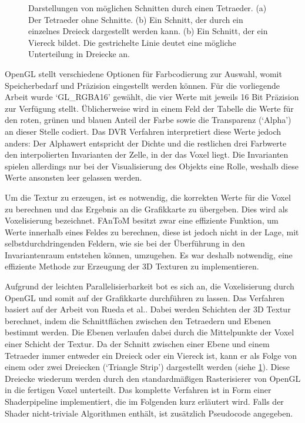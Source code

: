 \documentclass[a4paper,fontsize=12pt,toc=bib,halfparskip,ngerman]{scrartcl}
\begin{document}
\begin{figure}
\begin{subfigure}{0.2\textwidth}
		\caption{}
	\end{subfigure}
	\hspace{0.5cm}
	\caption{Darstellungen von m\"oglichen Schnitten durch einen Tetraeder. (a) Der Tetraeder ohne Schnitte. (b) Ein Schnitt, der durch ein einzelnes Dreieck dargestellt werden kann. (b) Ein Schnitt, der ein Viereck bildet. Die gestrichelte Linie deutet eine m\"ogliche Unterteilung in Dreiecke an.}
	\label{TetraCuts}
\end{figure}

OpenGL stellt verschiedene Optionen f\"ur Farbcodierung zur Auswahl, womit Speicherbedarf und Pr\"azision eingestellt werden k\"onnen. F\"ur die vorliegende Arbeit wurde `GL\_RGBA16' gew\"ahlt, die vier Werte mit jeweils 16 Bit Pr\"azision zur Verf\"ugung stellt. \"Ublicherweise wird in einem Feld der Tabelle die Werte f\"ur den roten, gr\"unen und blauen Anteil der Farbe sowie die Transparenz (`Alpha') an dieser Stelle codiert. Das DVR Verfahren interpretiert diese Werte jedoch anders: Der Alphawert entspricht der Dichte und die restlichen drei Farbwerte den interpolierten Invarianten der Zelle, in der das Voxel liegt. Die Invarianten spielen allerdings nur bei der Visualisierung des Objekts eine Rolle, weshalb diese Werte ansonsten leer gelassen werden.

Um die Textur zu erzeugen, ist es notwendig, die korrekten Werte f\"ur die Voxel zu berechnen und das Ergebnis an die Grafikkarte zu \"ubergeben. Dies wird als Voxelisierung bezeichnet. FAnToM besitzt zwar eine effiziente Funktion, um Werte innerhalb eines Feldes zu berechnen, diese ist jedoch nicht in der Lage, mit selbstdurchdringenden Feldern, wie sie bei der \"Uberf\"uhrung in den Invariantenraum entstehen k\"onnen, umzugehen. Es war deshalb notwendig, eine effiziente Methode zur Erzeugung der 3D Texturen zu implementieren. 

Aufgrund der leichten Parallelisierbarkeit bot es sich an, die Voxelisierung durch OpenGL und somit auf der Grafikkarte durchf\"uhren zu lassen. Das Verfahren basiert auf der Arbeit von Rueda et al.\cite{rueda2004voxelization}. Dabei werden Schichten der 3D Textur berechnet, indem die Schnittfl\"achen zwischen den Tetraedern und Ebenen bestimmt werden. Die Ebenen verlaufen dabei durch die Mittelpunkte der Voxel einer Schicht der Textur. Da der Schnitt zwischen einer Ebene und einem Tetraeder immer entweder ein Dreieck oder ein Viereck ist, kann er als Folge von einem oder zwei Dreiecken (`Triangle Strip') dargestellt werden (siehe \cref{TetraCuts}). Diese Dreiecke wiederum werden durch den standardm\"a{\ss}igen Rasterisierer von OpenGL in die fertigen Voxel unterteilt. Das komplette Verfahren ist in Form einer Shaderpipeline implementiert, die im Folgenden kurz erl\"autert wird. Falls der Shader nicht-triviale Algorithmen enth\"alt, ist zus\"atzlich Pseudocode angegeben.
\end{document}
